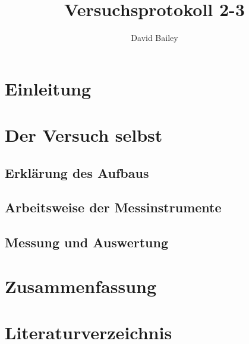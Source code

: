 \documentclass[11pt,a4paper]{article}
\author{David Bailey}
\title{Versuchsprotokoll 2-3}
\numberwithin{equation}{section}
\begin{document}


\tableofcontents

\newpage

\section{Einleitung}
\section{Der Versuch selbst}
\subsection{Erklärung des Aufbaus}
\subsection{Arbeitsweise der Messinstrumente}

\subsection{Messung und Auswertung}

\section{Zusammenfassung}

\section{Literaturverzeichnis}
\end{document}
